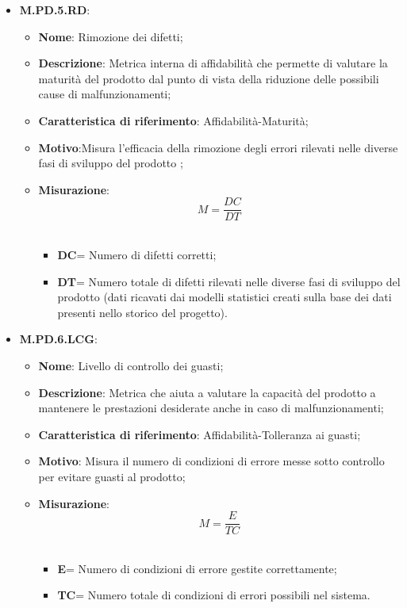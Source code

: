\documentclass[10pt, a4paper]{article}
\begin{document}
\begin{itemize}
\begin{itemize}
    \end{itemize}


    \item \textbf{M.PD.5.RD}:
    \begin{itemize}
        \item \textbf{Nome}: Rimozione dei difetti;
        \item \textbf{Descrizione}: Metrica interna di affidabilità che permette di valutare la maturità del prodotto dal punto di vista della riduzione delle possibili cause di malfunzionamenti;
        \item \textbf{Caratteristica di riferimento}: Affidabilità-Maturità;
        \item \textbf{Motivo}:Misura l'efficacia della rimozione degli errori rilevati nelle diverse fasi di sviluppo del prodotto ; 
       \item \textbf{Misurazione}:   \[ M=\frac{DC}{DT} \] \\
       \begin{itemize}
           \item \textbf{DC}= Numero di difetti corretti;
           \item \textbf{DT}= Numero totale di difetti rilevati nelle diverse fasi di sviluppo del prodotto (dati ricavati dai modelli statistici creati sulla base dei dati presenti nello storico del progetto).\\
       \end{itemize}
    \end{itemize}

    
    \item \textbf{M.PD.6.LCG}:
    \begin{itemize}
        \item \textbf{Nome}: Livello di controllo dei guasti;
        \item \textbf{Descrizione}: Metrica che aiuta a valutare la capacità del prodotto a mantenere le prestazioni desiderate anche in caso di malfunzionamenti;
        \item \textbf{Caratteristica di riferimento}: Affidabilità-Tolleranza ai guasti;
        \item \textbf{Motivo}: Misura il numero di condizioni di errore messe sotto controllo per evitare guasti al prodotto; 
       \item \textbf{Misurazione}:   \[ M=\frac{E}{TC} \] \\
       \begin{itemize}
           \item \textbf{E}= Numero di condizioni di errore gestite correttamente;
           \item \textbf{TC}= Numero totale di condizioni di errori possibili nel sistema.\\
       \end{itemize}
    \end{itemize}




\end{itemize}
\end{document}

